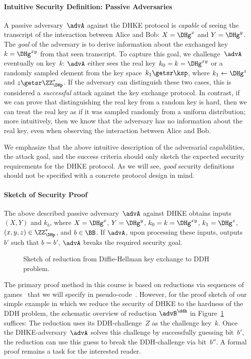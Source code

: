 \documentclass[a4paper,orivec]{llncs}
\begin{document}
\paragraph{Intuitive Security Definition: Passive Adversaries}
A passive adversary~$\advA$ against the DHKE protocol is \emph{capable} of seeing the transcript of the interaction between Alice and Bob: $X=\DHg^x$ and $Y=\DHg^y$.
The \emph{goal} of the adversary is to derive information about the exchanged key~$k=\DHg^{xy}$ from that seen transcript.
To capture this goal, we challenge~$\advA$ eventually on key~$k$:
$\advA$ either sees the real key~$k_0=k=\DHg^{xy}$ or a randomly sampled element from the key space~$k_1\getsr\ksp$, where $k_1\gets\DHg^z$ and $z\getsr\ZZ_\DHp^*$.
If the adversary can distinguish these two cases, this is considered a \emph{successful} attack against the key exchange protocol.
In contrast, if we can prove that distinguishing the real key from a random key is hard, then we can treat the real key as if it was sampled randomly from a uniform distribution;
more intuitively, then we know that the adversary has no information about the real key, even when observing the interaction between Alice and Bob.

We emphasize that the above intuitive description of the adversarial capabilities, the attack goal, and the success criteria should only sketch the expected security requirements for the DHKE protocol.
As we will see, \emph{good} security definitions should not be specified with a concrete protocol design in mind.

\paragraph{Sketch of Security Proof}
The above described passive adversary~$\advA$ against DHKE obtains inputs $(X,Y)$ and $k_b$, where $X=\DHg^x$, $Y=\DHg^y$, $k_0=k=\DHg^{xy}$, $k_1=\DHg^z$, $(x,y,z)\in\ZZ_\DHp^*$, and $b\in\BB$.
If $\advA$, upon processing these inputs, outputs $b'$ such that $b=b'$, $\advA$ breaks the required security goal.

\begin{figure}
    \centering
    
    \caption{Sketch of reduction from Diffie-Hellman key exchange to DDH problem.}
    \label{fig:dhke:reduction}
\end{figure}

The primary proof method in this course is based on reductions via sequences of games~\cite{EPRINT:Shoup04} that we will specify in pseudo-code~\cite{EC:BelRog06}.
However, for the proof sketch of our simple example in which we reduce the security of DHKE to the hardness of the DDH problem, the schematic overview of reduction $\advB^\ddh$ in Figure~\ref{fig:dhke:reduction} suffices:
The reduction uses its DDH-challenge~$Z$ as the challenge key~$k$.
Once the DHKE-adversary~$\advA$ solves this challenge by successfully guessing bit~$b'$, the reduction can use this guess to break the DDH-challenge via bit~$b''$.
A formal proof remains a task for the interested reader.
\end{document}
